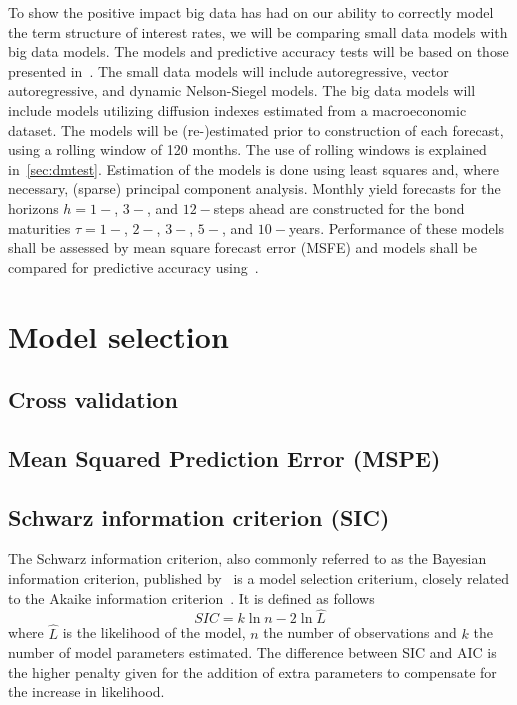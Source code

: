 To show the positive impact big data has had on our ability to correctly model the term structure of interest rates, we will be comparing small data models with big data models. 
The models and predictive accuracy tests will be based on those presented in~\textcite{Swanson2017}. 
The small data models will include autoregressive, vector autoregressive, and dynamic Nelson-Siegel models. 
The big data models will include models utilizing diffusion indexes estimated from a macroeconomic dataset. 
The models will be (re-)estimated prior to construction of each forecast, using a rolling window of 120 months. 
The use of rolling windows is explained in~\cref{sec:dmtest}. 
Estimation of the models is done using least squares and, where necessary, (sparse) principal component analysis. 
Monthly yield forecasts for the horizons $h = 1-$, $3-$, and $12-$steps ahead are constructed for the bond maturities $\tau = 1-$, $2-$, $3-$, $5-$, and $10-$years. 
Performance of these models shall be assessed by mean square forecast error (MSFE) and models shall be compared for predictive accuracy using~\textcite[hereafter DM]{Diebold1994}. 

\section{Model selection}
\subsection{Cross validation}


\subsection{Mean Squared Prediction Error (MSPE)}


\subsection{Schwarz information criterion (SIC)}
\label{sec:sic}
The Schwarz information criterion, also commonly referred to as the Bayesian information criterion, published by~\textcite[hereafter SIC]{Schwarz1978} is a model selection criterium, closely related to the Akaike information criterion~\parencite{Akaike1974}. 
It is defined as follows
\begin{equation}
	SIC = k\ln{n} - 2\ln{\hat{L}}
\end{equation}
where $\hat{L}$ is the likelihood of the model, $n$ the number of observations and $k$ the number of model parameters estimated. The difference between SIC and AIC is the higher penalty given for the addition of extra parameters to compensate for the increase in likelihood.

